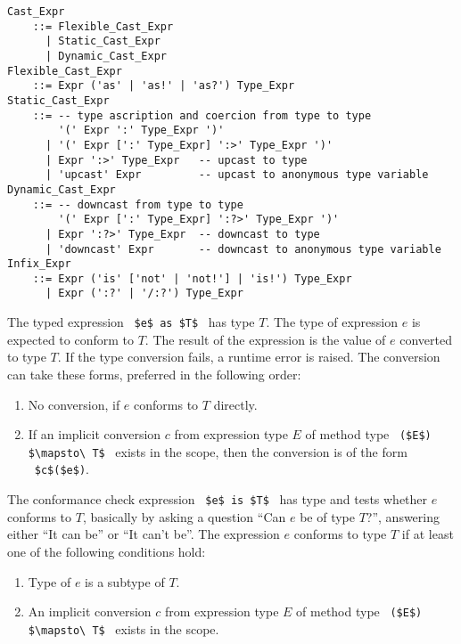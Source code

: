 \grammar\begin{lstlisting}
Cast_Expr 
    ::= Flexible_Cast_Expr
      | Static_Cast_Expr
      | Dynamic_Cast_Expr
Flexible_Cast_Expr
    ::= Expr ('as' | 'as!' | 'as?') Type_Expr
Static_Cast_Expr
    ::= -- type ascription and coercion from type to type
        '(' Expr ':' Type_Expr ')'  
      | '(' Expr [':' Type_Expr] ':>' Type_Expr ')'
      | Expr ':>' Type_Expr   -- upcast to type
      | 'upcast' Expr         -- upcast to anonymous type variable
Dynamic_Cast_Expr
    ::= -- downcast from type to type
        '(' Expr [':' Type_Expr] ':?>' Type_Expr ')'
      | Expr ':?>' Type_Expr  -- downcast to type
      | 'downcast' Expr       -- downcast to anonymous type variable
Infix_Expr 
    ::= Expr ('is' ['not' | 'not!'] | 'is!') Type_Expr
      | Expr (':?' | '/:?') Type_Expr
\end{lstlisting}

The typed expression ~\lstinline!$e$ as $T$!~ has type $T$. The type of expression $e$ is expected to conform to $T$. The result of the expression is the value of $e$ converted to type $T$. If the type conversion fails, a runtime error is raised. The conversion can take these forms, preferred in the following order:
\begin{enumerate}
  \item No conversion, if $e$ conforms to $T$ directly. 
  \item If an implicit conversion $c$ from expression type $E$ of method type ~\lstinline!($E$) $\mapsto\ T$!~ exists in the scope, then the conversion is of the form ~\lstinline!$c$($e$)!. 
\end{enumerate}

The conformance check expression ~\lstinline!$e$ is $T$!~ has type  and tests whether $e$ conforms to $T$, basically by asking a question ``Can $e$ be of type $T$?'', answering either ``It can be'' or ``It can't be''. The expression $e$ conforms to type $T$ if at least one of the following conditions hold:
\begin{enumerate}
  \item Type of $e$ is a subtype of $T$. 
  \item An implicit conversion $c$ from expression type $E$ of method type ~\lstinline!($E$) $\mapsto\ T$!~ exists in the scope. 
\end{enumerate}

